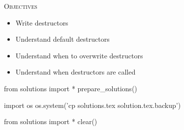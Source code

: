 
\textsc{Objectives}
\begin{itemize}
\item Write destructors
\item Understand default destructors
\item Understand when to overwrite destructors
\item Understand when destructors are called
\end{itemize}










\begin{python0}
from solutions import *
prepare_solutions()
\end{python0}
\begin{python}
import os
os.system('cp solutions.tex solution.tex.backup')  
\end{python}

\begin{python0}
from solutions import *
clear()
\end{python0}
